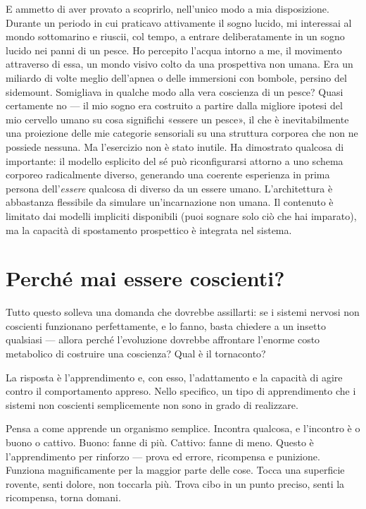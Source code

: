 \documentclass[11pt, twoside, openright]{book}
\begin{document}
E ammetto di aver provato a scoprirlo, nell'unico modo a mia disposizione. Durante un periodo in cui praticavo attivamente il sogno lucido, mi interessai al mondo sottomarino e riuscii, col tempo, a entrare deliberatamente in un sogno lucido nei panni di un pesce. Ho percepito l'acqua intorno a me, il movimento attraverso di essa, un mondo visivo colto da una prospettiva non umana. Era un miliardo di volte meglio dell'apnea o delle immersioni con bombole, persino del sidemount. Somigliava in qualche modo alla vera coscienza di un pesce? Quasi certamente no --- il mio sogno era costruito a partire dalla migliore ipotesi del mio cervello umano su cosa significhi «essere un pesce», il che è inevitabilmente una proiezione delle mie categorie sensoriali su una struttura corporea che non ne possiede nessuna. Ma l'esercizio non è stato inutile. Ha dimostrato qualcosa di importante: il modello esplicito del sé può riconfigurarsi attorno a uno schema corporeo radicalmente diverso, generando una coerente esperienza in prima persona dell'\textit{essere} qualcosa di diverso da un essere umano. L'architettura è abbastanza flessibile da simulare un'incarnazione non umana. Il contenuto è limitato dai modelli impliciti disponibili (puoi sognare solo ciò che hai imparato), ma la capacità di spostamento prospettico è integrata nel sistema.

\section*{Perché mai essere coscienti?}

Tutto questo solleva una domanda che dovrebbe assillarti: se i sistemi nervosi non coscienti funzionano perfettamente, e lo fanno, basta chiedere a un insetto qualsiasi --- allora perché l'evoluzione dovrebbe affrontare l'enorme costo metabolico di costruire una coscienza? Qual è il tornaconto?

La risposta è l'apprendimento e, con esso, l'adattamento e la capacità di agire contro il comportamento appreso. Nello specifico, un tipo di apprendimento che i sistemi non coscienti semplicemente non sono in grado di realizzare.

Pensa a come apprende un organismo semplice. Incontra qualcosa, e l'incontro è o buono o cattivo. Buono: fanne di più. Cattivo: fanne di meno. Questo è l'apprendimento per rinforzo --- prova ed errore, ricompensa e punizione. Funziona magnificamente per la maggior parte delle cose. Tocca una superficie rovente, senti dolore, non toccarla più. Trova cibo in un punto preciso, senti la ricompensa, torna domani.
\end{document}
